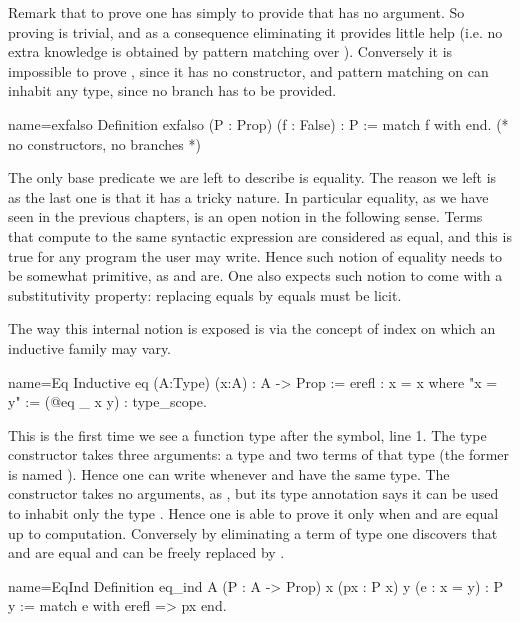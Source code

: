 Remark that to prove  one has simply to provide  that has no
argument.  So proving  is trivial, and as a consequence eliminating it
provides little help (i.e. no extra knowledge is obtained by pattern matching
over ).  Conversely it is impossible to prove , since it has no
constructor, and pattern matching on  can inhabit any type, since no
branch has to be provided.

\begin{coq}{name=exfalso}{}
Definition exfalso (P : Prop) (f : False) : P :=
  match f with end.  (* no constructors, no branches *)
\end{coq}

The only base predicate we are left to describe is equality.  The reason we
left is as the last one is that it has a tricky nature.  In particular
equality, as we have seen in the previous chapters, is an open notion
in the following sense.  Terms that compute to the same syntactic expression
are considered as equal, and this is true for any program the user may write.
Hence such notion of equality needs to be somewhat primitive, as
 and  are.  One also expects such notion to come
with a substitutivity property: replacing equals by equals must be licit.

The way this internal notion is exposed is via the concept of index
on which an inductive family may vary.

\begin{coq}{name=Eq}{}
Inductive eq (A:Type) (x:A) : A -> Prop := erefl : x = x
where "x = y" := (@eq _ x y) : type_scope.
\end{coq}

This is the first time we see a function type after the \C{:} symbol, line 1.
The  type constructor takes three arguments: a type  and
two terms of that type (the former is named ).
Hence one can write  whenever  and 
have the same type.
The  constructor takes no arguments, as , but its type
annotation says it can be used to inhabit only the type .
Hence one is able to prove  it only when  and  are
equal up to computation.  Conversely by eliminating a term
of type  one discovers that   and  are
equal and  can be freely replaced by .

\begin{coq}{name=EqInd}{}
Definition eq_ind A (P : A -> Prop) x (px : P x) y (e : x = y) : P y :=
  match e with erefl => px end.
\end{coq}

